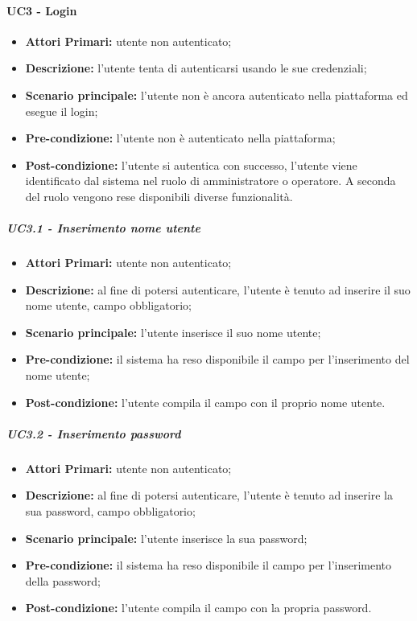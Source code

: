 \paragraph{UC3 - Login}
\begin{itemize}
	\item \textbf{Attori Primari:} utente non autenticato;
	\item \textbf{Descrizione:} l'utente tenta di autenticarsi usando le sue credenziali;
	\item \textbf{Scenario principale:} l'utente non è ancora autenticato nella piattaforma ed esegue il login;
	\item \textbf{Pre-condizione:} l'utente non è autenticato nella piattaforma;
	\item \textbf{Post-condizione:} l'utente si autentica con successo, l'utente viene identificato dal sistema nel ruolo di amministratore o operatore. A seconda del ruolo vengono rese disponibili diverse funzionalità.
\end{itemize}

\subparagraph{UC3.1 - Inserimento nome utente}
\begin{itemize}
	\item \textbf{Attori Primari:} utente non autenticato;
	\item \textbf{Descrizione:} al fine di potersi autenticare, l'utente è tenuto ad inserire il suo nome utente, campo obbligatorio;
	\item \textbf{Scenario principale:} l'utente inserisce il suo nome utente;
	\item \textbf{Pre-condizione:} il sistema ha reso disponibile il campo per l'inserimento del nome utente;
	\item \textbf{Post-condizione:} l'utente compila il campo con il proprio nome utente.
\end{itemize}	

\subparagraph{UC3.2 - Inserimento password}
\begin{itemize}
	\item \textbf{Attori Primari:} utente non autenticato;
	\item \textbf{Descrizione:} al fine di potersi autenticare, l'utente è tenuto ad inserire la sua password, campo obbligatorio;
	\item \textbf{Scenario principale:} l'utente inserisce la sua password;
	\item \textbf{Pre-condizione:} il sistema ha reso disponibile il campo per l'inserimento della password;
	\item \textbf{Post-condizione:} l'utente compila il campo con la propria password.
\end{itemize}	

